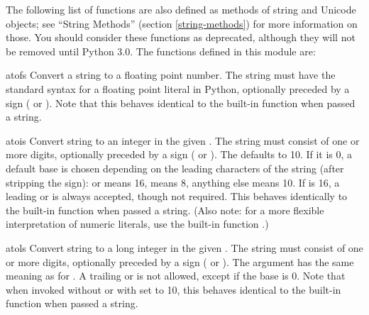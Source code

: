 The following list of functions are also defined as methods of string and
Unicode objects; see ``String Methods'' (section
\ref{string-methods}) for more information on those.  You should consider
these functions as deprecated, although they will not be removed until Python
3.0.  The functions defined in this module are:

\begin{funcdesc}{atof}{s}
  Convert a string to a floating point number.  The string must have
  the standard syntax for a floating point literal in Python,
  optionally preceded by a sign (\samp{+} or \samp{-}).  Note that
  this behaves identical to the built-in function
   when passed a string.

\end{funcdesc}

\begin{funcdesc}{atoi}{s}
  Convert string  to an integer in the given .  The
  string must consist of one or more digits, optionally preceded by a
  sign (\samp{+} or \samp{-}).  The  defaults to 10.  If it
  is 0, a default base is chosen depending on the leading characters
  of the string (after stripping the sign):  or 
  means 16,  means 8, anything else means 10.  If 
  is 16, a leading  or  is always accepted, though
  not required.  This behaves identically to the built-in function
   when passed a string.  (Also note: for a more
  flexible interpretation of numeric literals, use the built-in
  function .)
\end{funcdesc}

\begin{funcdesc}{atol}{s}
  Convert string  to a long integer in the given .
  The string must consist of one or more digits, optionally preceded
  by a sign (\samp{+} or \samp{-}).  The  argument has the
  same meaning as for .  A trailing  or
   is not allowed, except if the base is 0.  Note that when
  invoked without  or with  set to 10, this
  behaves identical to the built-in function
   when passed a string.
\end{funcdesc}

